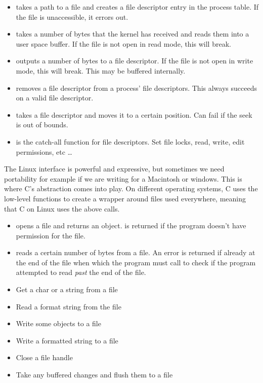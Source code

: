  \begin{itemize}
\item {} takes a path to a file and creates a file descriptor entry in the process table. If the file is unaccessible, it errors out.
\item {} takes a number of bytes that the kernel has received and reads them into a user space buffer. If the file is not open in read mode, this will break.
\item {} outputs a number of bytes to a file descriptor. If the file is not open in write mode, this will break. This may be buffered internally.
\item {} removes a file descriptor from a process' file descriptors. This always succeeds on a valid file descriptor.
\item {} takes a file descriptor and moves it to a certain position. Can fail if the seek is out of bounds.
\item {} is the catch-all function for file descriptors. Set file locks, read, write, edit permissions, etc \ldots{}
 \end{itemize}

The Linux interface is powerful and expressive, but sometimes we need portability for example if we are writing for a Macintosh or windows.
This is where C's abstraction comes into play.
On different operating systems, C uses the low-level functions to create a wrapper around files used everywhere, meaning that C on Linux uses the above calls.

\begin{itemize}
\item {} opens a file and returns an object.  is returned if the program doesn't have permission for the file.
\item {} reads a certain number of bytes from a file. An error is returned if already at the end of the file when which the program must call  to check if the program attempted to read \textit{past} the end of the file.
\item {} Get a char or a string from a file
\item {} Read a format string from the file
\item {} Write some objects to a file
\item {} Write a formatted string to a file
\item {} Close a file handle
\item {} Take any buffered changes and flush them to a file
\end{itemize}

